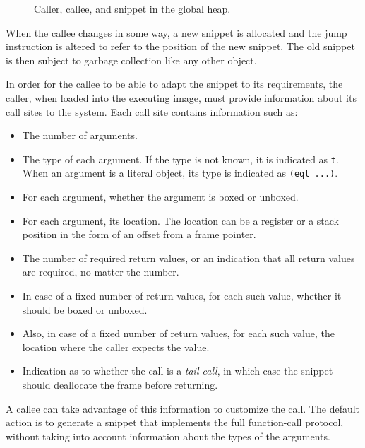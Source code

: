 \begin{figure}
\begin{center}
\end{center}
\caption{\label{fig-snippet}
Caller, callee, and snippet in the global heap.}
\end{figure}



When the callee changes in some way, a
new snippet is allocated and the jump instruction is altered to refer
to the position of the new snippet.  The old snippet is then subject
to garbage collection like any other object.

In order for the callee to be able to adapt the snippet to its
requirements, the caller, when loaded into the executing image, must
provide information about its call sites to the system.  Each call
site contains information such as:

\begin{itemize}
\item The number of arguments.
\item The type of each argument.  If the type is not known, it is
  indicated as \texttt{t}.  When an argument is a literal object, its
  type is indicated as \texttt{(eql ...)}.
\item For each argument, whether the argument is boxed or unboxed.
\item For each argument, its location.  The location can be a register
  or a stack position in the form of an offset from a frame pointer.
\item The number of required return values, or an indication that all
  return values are required, no matter the number.
\item In case of a fixed number of return values, for each such value,
  whether it should be boxed or unboxed.
\item Also, in case of a fixed number of return values, for each such
  value, the location where the caller expects the value.
\item Indication as to whether the call is a \emph{tail call}, in
  which case the snippet should deallocate the frame before
  returning.
\end{itemize}

A callee can take advantage of this information to customize the
call.  The default action is to generate a snippet that implements the
full function-call protocol, without taking into account information
about the types of the arguments.

